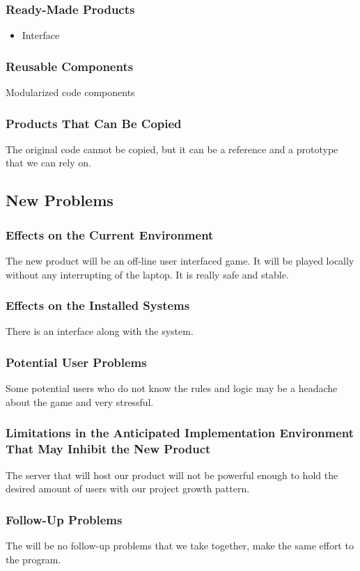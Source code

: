 \documentclass[10pt]{article}
\begin{document}
\subsubsection{Ready-Made Products}
\begin{itemize}
    \item Interface
\end{itemize}
\subsubsection{Reusable Components}
Modularized code components
\subsubsection{Products That Can Be Copied}
The original code cannot be copied, but it can be a reference and a prototype that we can rely on.
\subsection{New Problems}
\subsubsection{Effects on the Current Environment}
The new product will be an off-line user interfaced game. It will be played locally without any interrupting of the laptop. It is really safe and stable.
\subsubsection{Effects on the Installed Systems}
There is an interface along with the system.

\subsubsection{Potential User Problems}
Some potential users who do not know the rules and logic may be a headache about the game and very stressful.

\subsubsection{Limitations in the Anticipated Implementation Environment That May Inhibit the New Product}
The server that will host our product will not be powerful enough to hold the desired amount of users with our project growth pattern.
\subsubsection{Follow-Up Problems}
The will be no follow-up problems that we take together, make the same effort to the program.
\newpage
\end{document}
